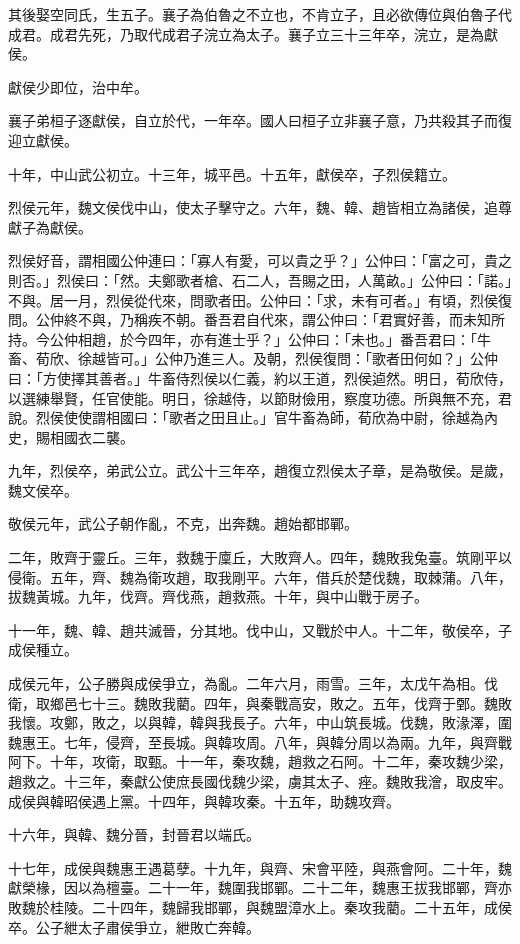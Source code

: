 \begin{pinyinscope}
其後娶空同氏，生五子。襄子為伯魯之不立也，不肯立子，且必欲傳位與伯魯子代成君。成君先死，乃取代成君子浣立為太子。襄子立三十三年卒，浣立，是為獻侯。

獻侯少即位，治中牟。

襄子弟桓子逐獻侯，自立於代，一年卒。國人曰桓子立非襄子意，乃共殺其子而復迎立獻侯。

十年，中山武公初立。十三年，城平邑。十五年，獻侯卒，子烈侯籍立。

烈侯元年，魏文侯伐中山，使太子擊守之。六年，魏、韓、趙皆相立為諸侯，追尊獻子為獻侯。

烈侯好音，謂相國公仲連曰：「寡人有愛，可以貴之乎？」公仲曰：「富之可，貴之則否。」烈侯曰：「然。夫鄭歌者槍、石二人，吾賜之田，人萬畝。」公仲曰：「諾。」不與。居一月，烈侯從代來，問歌者田。公仲曰：「求，未有可者。」有頃，烈侯復問。公仲終不與，乃稱疾不朝。番吾君自代來，謂公仲曰：「君實好善，而未知所持。今公仲相趙，於今四年，亦有進士乎？」公仲曰：「未也。」番吾君曰：「牛畜、荀欣、徐越皆可。」公仲乃進三人。及朝，烈侯復問：「歌者田何如？」公仲曰：「方使擇其善者。」牛畜侍烈侯以仁義，約以王道，烈侯逌然。明日，荀欣侍，以選練舉賢，任官使能。明日，徐越侍，以節財儉用，察度功德。所與無不充，君說。烈侯使使謂相國曰：「歌者之田且止。」官牛畜為師，荀欣為中尉，徐越為內史，賜相國衣二襲。

九年，烈侯卒，弟武公立。武公十三年卒，趙復立烈侯太子章，是為敬侯。是歲，魏文侯卒。

敬侯元年，武公子朝作亂，不克，出奔魏。趙始都邯鄲。

二年，敗齊于靈丘。三年，救魏于廩丘，大敗齊人。四年，魏敗我兔臺。筑剛平以侵衛。五年，齊、魏為衛攻趙，取我剛平。六年，借兵於楚伐魏，取棘蒲。八年，拔魏黃城。九年，伐齊。齊伐燕，趙救燕。十年，與中山戰于房子。

十一年，魏、韓、趙共滅晉，分其地。伐中山，又戰於中人。十二年，敬侯卒，子成侯種立。

成侯元年，公子勝與成侯爭立，為亂。二年六月，雨雪。三年，太戊午為相。伐衛，取鄉邑七十三。魏敗我藺。四年，與秦戰高安，敗之。五年，伐齊于鄄。魏敗我懷。攻鄭，敗之，以與韓，韓與我長子。六年，中山筑長城。伐魏，敗湪澤，圍魏惠王。七年，侵齊，至長城。與韓攻周。八年，與韓分周以為兩。九年，與齊戰阿下。十年，攻衛，取甄。十一年，秦攻魏，趙救之石阿。十二年，秦攻魏少梁，趙救之。十三年，秦獻公使庶長國伐魏少梁，虜其太子、痤。魏敗我澮，取皮牢。成侯與韓昭侯遇上黨。十四年，與韓攻秦。十五年，助魏攻齊。

十六年，與韓、魏分晉，封晉君以端氏。

十七年，成侯與魏惠王遇葛孽。十九年，與齊、宋會平陸，與燕會阿。二十年，魏獻榮椽，因以為檀臺。二十一年，魏圍我邯鄲。二十二年，魏惠王拔我邯鄲，齊亦敗魏於桂陵。二十四年，魏歸我邯鄲，與魏盟漳水上。秦攻我藺。二十五年，成侯卒。公子紲太子肅侯爭立，紲敗亡奔韓。


\end{pinyinscope}
